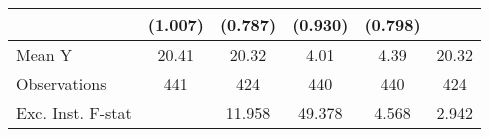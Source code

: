 {\begin{tabular}{l*{5}{c}}
            &     (1.007)         &     (0.787)         &     (0.930)         &     (0.798)         &                     \\
\midrule
Mean Y      &       20.41         &       20.32         &        4.01         &        4.39         &       20.32         \\
Observations&         441         &         424         &         440         &         440         &         424         \\
Exc. Inst. F-stat&                     &      11.958         &      49.378         &       4.568         &       2.942         \\
\bottomrule
\end{tabular}
}
